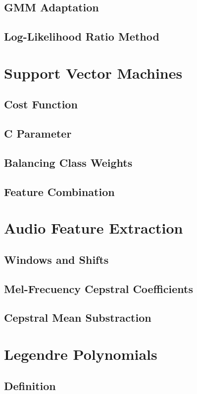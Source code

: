 \documentclass[11pt,a4paper]{tesis}
\begin{document}
		\subsection{GMM Adaptation}
		\subsection{Log-Likelihood Ratio Method}
	\section{Support Vector Machines}
		
		\subsection{Cost Function}
			
		\subsection{C Parameter}
			
		\subsection{Balancing Class Weights}
			
		\subsection{Feature Combination}
	\section{Audio Feature Extraction}
		\subsection{Windows and Shifts}
		\subsection{Mel-Frecuency Cepstral Coefficients}
			
		\subsection{Cepstral Mean Substraction}
	\section{Legendre Polynomials}
		\subsection{Definition}
\end{document}
